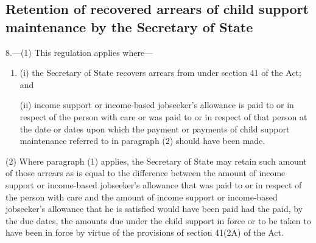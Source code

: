 \documentclass[12pt,a4paper]{article}
\begin{document}
%

\subsection[8. Retention of recovered arrears of child support maintenance by the Secretary of State]{\sloppy Retention of recovered arrears of child support maintenance by the Secretary of State}

8.—(1) This regulation applies where—
\begin{enumerate}\item[]
(i) the Secretary of State recovers arrears from 
under section 41 of the Act; and

(ii) income support
or income-based jobseeker’s allowance  %
is paid to or in respect of the person with care or was paid to or in respect of that person at the date or dates upon which the payment or payments of child support maintenance referred to in paragraph (2) should have been made.
\end{enumerate}

(2) Where paragraph (1) applies, the Secretary of State may retain such amount of those arrears as is equal to the difference between the amount of income support 
or income-based jobseeker’s allowance  %
that was paid to or in respect of the person with care and the amount of income support 
or income-based jobseeker’s allowance  %
that he is satisfied would have been paid had the 
paid, by the due dates, the amounts due under the child support 
in force or to be taken to have been in force by virtue of the provisions of section 41(2A) of the Act.
\end{document}
